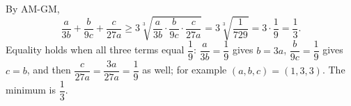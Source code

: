By AM-GM,
\[
\dfrac{a}{3b}+\dfrac{b}{9c}+\dfrac{c}{27a}\ge3\sqrt[3]{\dfrac{a}{3b}\cdot\dfrac{b}{9c}\cdot\dfrac{c}{27a}}=3\sqrt[3]{\dfrac{1}{729}}=3\cdot\dfrac{1}{9}=\dfrac{1}{3} .
\]
Equality holds when all three terms equal $\dfrac{1}{9}$: $\dfrac {a}{3b}=\dfrac{1}{9}$ gives $b=3a$, $\dfrac{b}{9c}=\dfrac{1}{9}$ gives $c=b$, and then $\dfrac{c}{27a}=\dfrac{3a}{27a}=\dfrac{1}{9}$ as well; for example $(a,b,c)=(1,3,3)$. The minimum is $\boxed{\dfrac{1}{3}}$.

